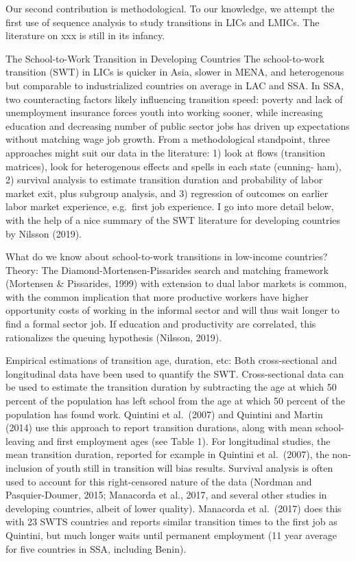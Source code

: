 \documentclass[
  a4paper, twoside, 12pt]{book}
\begin{document}
Our second contribution is methodological. To our knowledge, we attempt the first use of sequence analysis to study transitions in LICs and LMICs. The literature on xxx is still in its infancy.

The School-to-Work Transition in Developing Countries
The school-to-work transition (SWT) in LICs is quicker in Asia, slower in MENA, and heterogenous but comparable to industrialized countries on average in LAC and SSA. In SSA, two counteracting factors likely influencing transition speed: poverty and lack of unemployment insurance forces youth into working sooner, while increasing education and decreasing number of public sector jobs has driven up expectations without matching wage job growth.
From a methodological standpoint, three approaches might suit our data in the literature: 1) look at flows (transition matrices), look for heterogenous effects and spells in each state (cunning- ham), 2) survival analysis to estimate transition duration and probability of labor market exit, plus subgroup analysis, and 3) regression of outcomes on earlier labor market experience, e.g.~first job experience. I go into more detail below, with the help of a nice summary of the SWT literature for developing countries by Nilsson (2019).

What do we know about school-to-work transitions in low-income countries?
Theory:
The Diamond-Mortensen-Pissarides search and matching framework (Mortensen \& Pissarides, 1999) with extension to dual labor markets is common, with the common implication that more productive workers have higher opportunity costs of working in the informal sector and will thus wait longer to find a formal sector job. If education and productivity are correlated, this rationalizes the queuing hypothesis (Nilsson, 2019).

Empirical estimations of transition age, duration, etc:
Both cross-sectional and longitudinal data have been used to quantify the SWT. Cross-sectional data can be used to estimate the transition duration by subtracting the age at which 50 percent of the population has left school from the age at which 50 percent of the population has found work. Quintini et al.~(2007) and Quintini and Martin (2014) use this approach to report transition durations, along with mean school-leaving and first employment ages (see Table 1). For longitudinal studies, the mean transition duration, reported for example in Quintini et al.~(2007), the non- inclusion of youth still in transition will bias results. Survival analysis is often used to account for this right-censored nature of the data (Nordman and Pasquier-Doumer, 2015; Manacorda et al., 2017, and several other studies in developing countries, albeit of lower quality). Manacorda et al.~(2017) does this with 23 SWTS countries and reports similar transition times to the first job as Quintini, but much longer waits until permanent employment (11 year average for five countries in SSA, including Benin).
\end{document}
